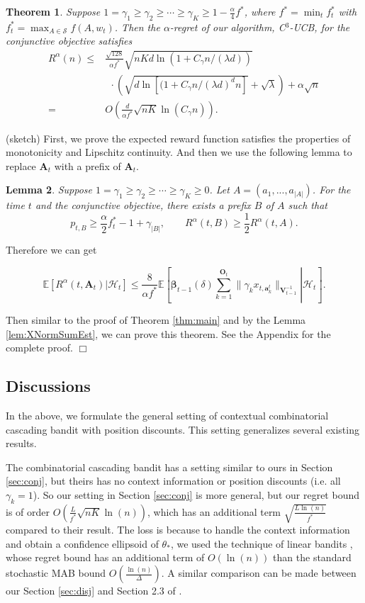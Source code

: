 \documentclass{article}
\newcommand{\bbeta}{\boldsymbol{\beta}}
\newcommand{\EE}{\mathbb{E}}
\newcommand{\bA}{\mathbf{A}}
\newcommand{\ba}{\mathbf{a}}
\newcommand{\bO}{\mathbf{O}}
\newcommand{\bV}{\mathbf{V}}
\newcommand{\cH}{\mathcal{H}}
\newcommand{\cS}{\mathcal{S}}
\newcommand{\abs}[1]{\left| #1 \right|}
\newcommand{\norm}[1]{\| #1 \|}
\newtheorem{theorem}{Theorem}[section]
\newtheorem{lemma}[theorem]{Lemma}%
\newenvironment{proof}{\noindent {\textbf{Proof. }}}{$\Box$ \medskip}
\newcommand{\CLemmaPrefixExi}{
	Suppose $1 = \gamma_1 \geq \gamma_2 \geq \cdots \geq \gamma_K \geq 0$. Let $A = (a_1, ..., a_{\abs{A}})$. For the time $t$ and the conjunctive objective, there exists a prefix $B$ of $A$ such that 
	$$
	p_{t, B} \geq \frac{\alpha}{2}f_{t}^{\ast} - 1 + \gamma_{\abs{B}}, \qquad R^{\alpha}(t, B) \geq \frac{1}{2} R^{\alpha}(t, A).
	$$ 
}
\newcommand{\CEqDeltaEstAnd}{
	$$
	\EE [R^{\alpha}(t, \bA_t) |\cH_t ] \leq \frac{8}{\alpha f^{\ast}} \EE \left[ \left. \bbeta_{t-1}(\delta)\sum_{k=1}^{\bO_t}\norm{\gamma_k x_{t,\ba_k^t}}_{\bV_{t-1}^{-1}} \right| \cH_t\right].
	$$
}
\begin{document}
\begin{theorem} %
	\label{thm:and}
	Suppose $1 = \gamma_1 \geq \gamma_2 \geq \cdots \geq \gamma_{K} \geq 1 - \frac{\alpha}{4} f^{\ast}$, where $f^* = \min_{t} f_t^{\ast}$ with $f_t^{\ast} = \max_{A \in \cS} f(A, w_t)$. Then the $\alpha$-regret of our algorithm, C$^3$-UCB, for the conjunctive objective satisfies
	\begin{align}
		R^{\alpha}(n) \le& \frac{\sqrt{128}}{\alpha f^{\ast}} \sqrt{nKd\ln(1 + C_\gamma n/(\lambda d))} \nonumber \\
		&~~ \cdot \left(\sqrt{d\ln[(1 + C_\gamma n/(\lambda d)^d n] } + \sqrt{\lambda}\right) + \alpha \sqrt{n} \nonumber \\
		=&O\left(\frac{d}{\alpha f^{\ast}}\sqrt{nK} \ln(C_{\gamma} n) \right).
	\end{align}
\end{theorem}
\begin{proof}
	(sketch) First, we prove the expected reward function satisfies the properties of monotonicity and Lipschitz continuity. And then we use the following lemma to replace $\bA_t$ with a prefix of $\bA_t$.
	\begin{lemma}
		\CLemmaPrefixExi
	\end{lemma}
	
	Therefore we can get
	\CEqDeltaEstAnd
	
	Then similar to the proof of Theorem \ref{thm:main} and by the Lemma \ref{lem:XNormSumEst}, we can prove this theorem. See the Appendix for the complete proof.
\end{proof}


\subsection{Discussions}
\label{sec:diss}

In the above, we formulate the general setting of contextual combinatorial cascading bandit with position discounts. This setting generalizes several existing results. 

The combinatorial cascading bandit \cite{kveton2015combinatorial} has a setting similar to ours in Section \ref{sec:conj}, but theirs has no context information or position discounts (i.e. all $\gamma_k = 1$). So our setting in Section \ref{sec:conj} is more general, but our regret bound is of order $O\left(\frac{L}{f^*}\sqrt{nK}\ln(n)\right)$, which has an additional term $\sqrt{\frac{L\ln(n)}{f^*}}$ compared to their result. The loss is because to handle the context information and obtain a confidence ellipsoid of $\theta_{\ast}$, we used the technique of linear bandits \cite{abbasi2011improved}, whose regret bound has an additional term of $O(\ln(n))$ than the standard stochastic MAB bound $O(\frac{\ln(n)}{\Delta})$. A similar comparison can be made between our Section \ref{sec:disj} and Section 2.3 of \cite{kveton2015combinatorial}.
\end{document}
